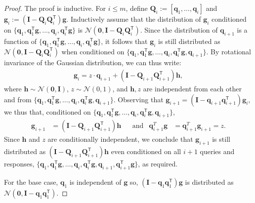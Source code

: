 \documentclass[10pt,a4paper]{amsart}
\newcommand{\T}{\mathsf{T}}
\newcommand{\bv}[1]{\boldsymbol{\mathbf{#1}}}
\newcommand{\transpose}{\mathsf{T}}
\begin{document}
\begin{proof}
The proof is inductive. For $i \leq m$, define $\bv{Q}_i := [\bv{q}_1, \ldots, \bv{q}_i]$ and $\bv{g}_i := (\bv{I} - \bv{Q}_i\bv{Q}_i^\transpose)\bv{g}$. 
Inductively assume that the distribution of $\bv{g}_i$ conditioned on 
$\{\bv{q}_1, \bv{q}_1^\transpose \bv{g}, \ldots, \bv{q}_{i}, \bv{q}_{i}^\transpose \bv{g}\}$ is $\mathcal{N}(\bv{0}, \bv{I} - \bv{Q}_i\bv{Q}_i^\transpose)$.
Since the distribution of $\bv{q}_{i+1}$ is a function of $\{\bv{q}_1, \bv{q}_1^\transpose \bv{g}, \ldots, \bv{q}_{i}, \bv{q}_{i}^\transpose \bv{g}\}$, it follows that $\bv{g}_i$ is still distributed as $\mathcal{N}(\bv{0}, \bv{I} - \bv{Q}_i\bv{Q}_i^\transpose)$ when conditioned on $\{\bv{q}_1, \bv{q}_1^\transpose \bv{g}, \ldots, \bv{q}_{i}, \bv{q}_{i}^\transpose \bv{g}, \bv{q}_{i+1}\}$. 
%
By rotational invariance of the Gaussian distribution, we can thus write:
\begin{align*}
\bv{g}_i = z\cdot \bv{q}_{i+1} + (\bv{I} - \bv{Q}_{i+1}\bv{Q}_{i+1}^\transpose)\bv{h}, 
\end{align*}
where $\bv{h} \sim\mathcal{N}(\bv{0}, \bv{I})$, $z \sim \mathcal{N}(0,1)$, and $\bv{h}, z$ are independent from each other and from $\{\bv q_1, \bv q_1^\transpose \bv g, \ldots, \bv q_i, \bv q_i^\transpose \bv g, \bv q_{i+1}\}$.
Observing that $\bv{g}_{i+1} = (\bv{I}-\bv{q}_{i+1}\bv{q}_{i+1}^\transpose)\bv{g}_i$, we thus that, conditioned on $\{\bv{q}_1, \bv{q}_1^\transpose \bv{g}, \ldots, \bv{q}_{i}, \bv{q}_{i}^\transpose \bv{g}, \bv{q}_{i+1}\}$,
\begin{align*}
\bv{g}_{i+1} &= (\bv I - \bv Q_{i+1} \bv Q_{i+1}^\T)\bv{h} & &\text{and} & \bv{q}_{i+1}^T\bv{g} &= \bv{q}_{i+1}^T\bv{g}_{i+1} = z.
\end{align*}
Since $\bv{h}$ and $z$ are conditionally independent, we conclude that $\bv{g}_{i+1}$ is still distributed as $(\bv{I} - \bv{Q}_{i+1}\bv{Q}_{i+1}^\transpose) \bv{h}$ even conditioned on all $i+1$ queries and responses, $\{\bv{q}_1, \bv{q}_1^\transpose \bv{g}, \ldots, \bv{q}_{i}, \bv{q}_{i}^\transpose \bv{g}, \bv{q}_{i+1}, \bv{q}_{i+1}^\T\bv{g}\}$, as required.

For the base case, $\bv{q}_1$ is independent of $\bv{g}$ so, $(\bv{I} -\bv{q}_1\bv{q}_1^\transpose)\bv{g}$ is distributed as $\mathcal{N}(\bv{0}, \bv{I} - \bv{q}_1\bv{q}_1^\transpose)$. 
\end{proof}
\end{document}
